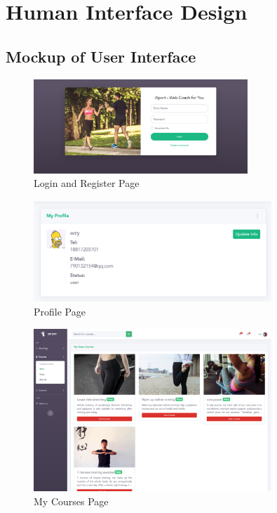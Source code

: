 \documentclass[16pt]{scrreprt}
\begin{document}
 


\chapter{Human Interface Design}

\section{Mockup of User Interface}
\begin{figure}[H]
	\centering
	\includegraphics[width=0.72\textwidth]{diagrams/login_register.png}
	\caption{Login and Register Page}
\end{figure}

\begin{figure}[H]
	\centering
	\includegraphics[width=0.8\textwidth]{diagrams/profile.png}
	\caption{Profile Page}
\end{figure}

\begin{figure}[H]
	\centering
	\includegraphics[width=0.8\textwidth]{diagrams/mine.png}
	\caption{My Courses Page}
\end{figure}
\end{document}
